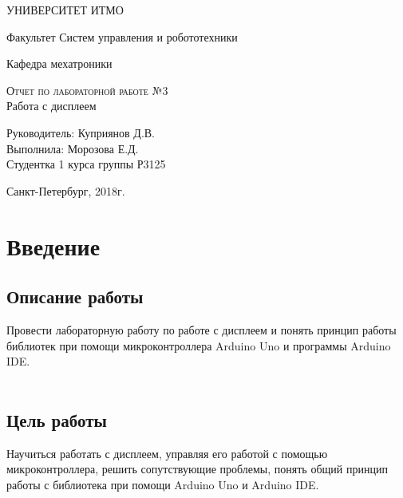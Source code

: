 \documentclass[12pt,a4paper]{scrartcl}
\begin{document}
\begin{titlepage}
  \begin{center}
    \large
 
    УНИВЕРСИТЕТ ИТМО
    \vspace{0.25cm}
     
    Факультет Систем управления и робототехники
     
    Кафедра мехатроники
    \vfill
 
    \textsc{Отчет по лабораторной работе №3}\\[5mm]
     
    {\LARGE Работа с дисплеем}

\end{center}
\vfill
 
\newlength{\ML}
\hfill\begin{minipage}{0.4\textwidth}
  Руководитель: Куприянов Д.В.\\
  Выполнила: Морозова Е.Д. \\
  Студентка 1 курса группы Р3125\\
  
  
\end{minipage}%
\bigskip

 
\begin{center}
  Санкт-Петербург, 2018г.
\end{center}
\end{titlepage}

\begin{tableofcontents}
\end{tableofcontents}
    \newpage
    
\section{Введение}

\label{sec:intro}
 
\subsection{Описание работы}
Провести лабораторную работу по работе с дисплеем и понять принцип работы библиотек при помощи микроконтроллера Arduino Uno и программы Arduino IDE.\\
\\

\subsection{Цель работы}
Научиться работать с дисплеем, управляя его работой с помощью микроконтроллера, решить сопутствующие проблемы, понять общий принцип работы с библиотека при помощи Arduino Uno и Arduino IDE.
\end{document}
